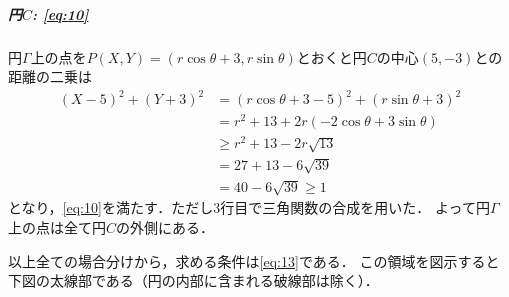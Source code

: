 \documentclass[../../main.tex]{subfiles}
\begin{document}
\subparagraph{円$C$: \cref{eq:10}}

円$\Gamma$上の点を$P(X,Y)=(r\cos\theta+3,r\sin\theta)$とおくと円$C$の中心$(5,-3)$との距離の二乗は
\begin{align}
  (X-5)^2 + (Y+3)^2
  &= (r\cos\theta+3-5)^2+\left(r\sin\theta+3\right)^2 \\
  &= r^2 + 13 + 2r(-2\cos\theta + 3\sin\theta) \\
  &\ge r^2 + 13 - 2r\sqrt{13} \\
  &= 27 + 13 -6\sqrt{39} \\
  &= 40 - 6\sqrt{39} \ge 1
\end{align}
となり，\cref{eq:10}を満たす．ただし3行目で三角関数の合成を用いた．
よって円$\Gamma$上の点は全て円$C$の外側にある．
\casesend

以上全ての場合分けから，求める条件は\cref{eq:13}である．
この領域を図示すると下図の太線部である（円の内部に含まれる破線部は除く）．
\end{document}
